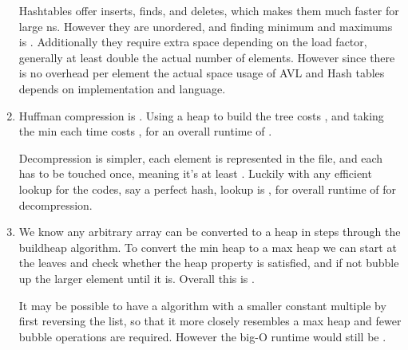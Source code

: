 \documentclass[12pt]{chmullighw}
\begin{document}
\begin{enumerate}
Hashtables offer  inserts, finds, and deletes, which makes them much
faster for large ns. However they are unordered, and finding minimum and
maximums is . Additionally they require extra space depending on the
load factor, generally at least double the actual number of elements. However
since there is no overhead per element the actual space usage of AVL and Hash
tables depends on implementation and language.

\item Huffman compression is . Using a heap to build the tree
costs , and taking the min each time costs , for an overall
runtime of .

Decompression is simpler, each element is represented in the file, and each has
to be touched once, meaning it's at least . Luckily with any efficient
lookup for the codes, say a perfect hash, lookup is , for overall
runtime of  for decompression.

\item We know any arbitrary array can be converted to a heap in  steps
through the buildheap algorithm. To convert the min heap to a max heap we can
start at the leaves and check whether the heap property is satisfied, and if not
bubble up the larger element until it is. Overall this is . 

It may be possible to have a  algorithm with a smaller constant multiple
by first reversing the list, so that it more closely resembles a max heap and
fewer bubble operations are required. However the big-O runtime would still be
.

\end{enumerate} %
\end{document}
